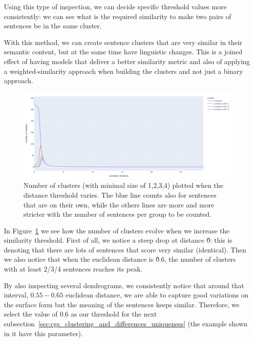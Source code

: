 Using this type of inspection, we can decide specific threshold values more consistently: we can see what is the required similarity to make two pairs of sentences be in the same cluster.

With this method, we can create sentence clusters that are very similar in their semantic content, but at the same time have linguistic changes. This is a joined effect of having models that deliver a better similarity metric and also of applying a weighted-similarity approach when building the clusters and not just a binary approach.

\begin{figure}[!htbp]
    \centering
    \includegraphics[width=\linewidth]{figures/clusters_count_by_threshold.png}
    \caption{Number of clusters (with minimal size of 1,2,3,4) plotted when the distance threshold varies. The blue line counts also for sentences that are on their own, while the others lines are more and more stricter with the number of sentences per group to be counted.}
    \label{fig:clusers_count_by_threshold}
\end{figure}
In Figure~\ref{fig:clusers_count_by_threshold} we see how the number of clusters evolve when we increase the similarity threshold. First of all, we notice a steep drop at distance \~0: this is denoting that there are lots of sentences that score very similar (identical). Then we also notice that when the euclidean distance is \~0.6, the number of clusters with at least 2/3/4 sentences reaches its peak.

By also inspecting several dendrograms, we consistently notice that around that interval, $0.55-0.65$ euclidean distance, we are able to capture good variations on the surface form but the meaning of the sentences keeps similar.
Therefore, we select the value of $0.6$ as our threshold for the next subsection~\ref{sec:cgs_clustering_and_differences_uniqueness} (the example shown in it have this parameter).


